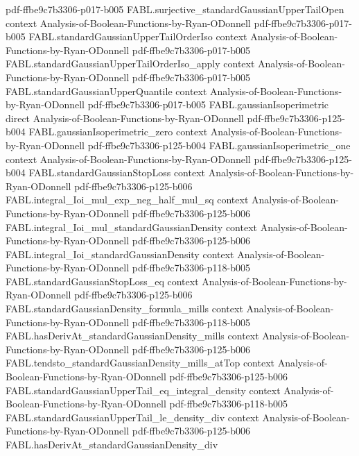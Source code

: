 \begin{theorem}
  {pdf-ffbe9c7b3306-p017-b005}
\proofstep
  {FABL.surjective_standardGaussianUpperTailOpen}
  {context}
  {Analysis-of-Boolean-Functions-by-Ryan-ODonnell}
  {pdf-ffbe9c7b3306-p017-b005}
\proofstep
  {FABL.standardGaussianUpperTailOrderIso}
  {context}
  {Analysis-of-Boolean-Functions-by-Ryan-ODonnell}
  {pdf-ffbe9c7b3306-p017-b005}
\proofstep
  {FABL.standardGaussianUpperTailOrderIso_apply}
  {context}
  {Analysis-of-Boolean-Functions-by-Ryan-ODonnell}
  {pdf-ffbe9c7b3306-p017-b005}
\proofstep
  {FABL.standardGaussianUpperQuantile}
  {context}
  {Analysis-of-Boolean-Functions-by-Ryan-ODonnell}
  {pdf-ffbe9c7b3306-p017-b005}
\proofstep
  {FABL.gaussianIsoperimetric}
  {direct}
  {Analysis-of-Boolean-Functions-by-Ryan-ODonnell}
  {pdf-ffbe9c7b3306-p125-b004}
\proofstep
  {FABL.gaussianIsoperimetric_zero}
  {context}
  {Analysis-of-Boolean-Functions-by-Ryan-ODonnell}
  {pdf-ffbe9c7b3306-p125-b004}
\proofstep
  {FABL.gaussianIsoperimetric_one}
  {context}
  {Analysis-of-Boolean-Functions-by-Ryan-ODonnell}
  {pdf-ffbe9c7b3306-p125-b004}
\proofstep
  {FABL.standardGaussianStopLoss}
  {context}
  {Analysis-of-Boolean-Functions-by-Ryan-ODonnell}
  {pdf-ffbe9c7b3306-p125-b006}
\proofstep
  {FABL.integral_Ioi_mul_exp_neg_half_mul_sq}
  {context}
  {Analysis-of-Boolean-Functions-by-Ryan-ODonnell}
  {pdf-ffbe9c7b3306-p125-b006}
\proofstep
  {FABL.integral_Ioi_mul_standardGaussianDensity}
  {context}
  {Analysis-of-Boolean-Functions-by-Ryan-ODonnell}
  {pdf-ffbe9c7b3306-p125-b006}
\proofstep
  {FABL.integral_Ioi_standardGaussianDensity}
  {context}
  {Analysis-of-Boolean-Functions-by-Ryan-ODonnell}
  {pdf-ffbe9c7b3306-p118-b005}
\proofstep
  {FABL.standardGaussianStopLoss_eq}
  {context}
  {Analysis-of-Boolean-Functions-by-Ryan-ODonnell}
  {pdf-ffbe9c7b3306-p125-b006}
\proofstep
  {FABL.standardGaussianDensity_formula_mills}
  {context}
  {Analysis-of-Boolean-Functions-by-Ryan-ODonnell}
  {pdf-ffbe9c7b3306-p118-b005}
\proofstep
  {FABL.hasDerivAt_standardGaussianDensity_mills}
  {context}
  {Analysis-of-Boolean-Functions-by-Ryan-ODonnell}
  {pdf-ffbe9c7b3306-p125-b006}
\proofstep
  {FABL.tendsto_standardGaussianDensity_mills_atTop}
  {context}
  {Analysis-of-Boolean-Functions-by-Ryan-ODonnell}
  {pdf-ffbe9c7b3306-p125-b006}
\proofstep
  {FABL.standardGaussianUpperTail_eq_integral_density}
  {context}
  {Analysis-of-Boolean-Functions-by-Ryan-ODonnell}
  {pdf-ffbe9c7b3306-p118-b005}
\proofstep
  {FABL.standardGaussianUpperTail_le_density_div}
  {context}
  {Analysis-of-Boolean-Functions-by-Ryan-ODonnell}
  {pdf-ffbe9c7b3306-p125-b006}
\proofstep
  {FABL.hasDerivAt_standardGaussianDensity_div}

\end{theorem}
